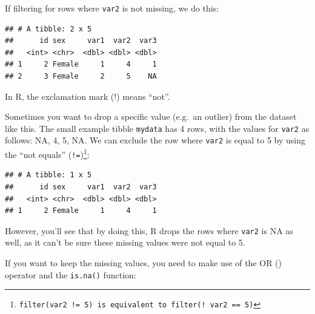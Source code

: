 \documentclass[12pt,]{krantz}
\makeatletter
\newenvironment{Shaded}{\begin{snugshade}}{\end{snugshade}}
\newcommand{\DecValTok}[1]{\textcolor[rgb]{0.00,0.00,0.81}{#1}}
\newcommand{\KeywordTok}[1]{\textcolor[rgb]{0.13,0.29,0.53}{\textbf{#1}}}
\newcommand{\NormalTok}[1]{#1}
\newcommand{\OperatorTok}[1]{\textcolor[rgb]{0.81,0.36,0.00}{\textbf{#1}}}
\newcommand{\StringTok}[1]{\textcolor[rgb]{0.31,0.60,0.02}{#1}}
\newenvironment{kframe}{%
\medskip{}
\setlength{\fboxsep}{.8em}
 \def\at@end@of@kframe{}%
 \ifinner\ifhmode%
  \def\at@end@of@kframe{\end{minipage}}%
  \begin{minipage}{\columnwidth}%
 \fi\fi%
 \def\FrameCommand##1{\hskip\@totalleftmargin \hskip-\fboxsep
 \colorbox{shadecolor}{##1}\hskip-\fboxsep
     \hskip-\linewidth \hskip-\@totalleftmargin \hskip\columnwidth}%
 \MakeFramed {\advance\hsize-\width
   \@totalleftmargin\z@ \linewidth\hsize
   \@setminipage}}%
 {\par\unskip\endMakeFramed%
 \at@end@of@kframe}
\renewenvironment{Shaded}{\begin{kframe}}{\end{kframe}}
\theoremstyle{definition}
\theoremstyle{definition}
\theoremstyle{definition}
\theoremstyle{remark}
\makeatother
\begin{document}
If filtering for rows where \texttt{var2} is not missing, we do this:

\begin{Shaded}
\end{Shaded}

\begin{verbatim}
## # A tibble: 2 x 5
##      id sex     var1  var2  var3
##   <int> <chr>  <dbl> <dbl> <dbl>
## 1     2 Female     1     4     1
## 2     3 Female     2     5    NA
\end{verbatim}

In R, the exclamation mark (!) means ``not''.

Sometimes you want to drop a specific value (e.g.~an outlier) from the
dataset like this. The small example tibble \texttt{mydata} has 4 rows,
with the values for \texttt{var2} as follows: NA, 4, 5, NA. We can
exclude the row where \texttt{var2} is equal to 5 by using the ``not
equals'' (\texttt{!=})\footnote{\texttt{filter(var2\ !=\ 5)\ is\ equivalent\ tolter(!\ var2\ ==\ 5)}}:

\begin{Shaded}
\end{Shaded}

\begin{verbatim}
## # A tibble: 1 x 5
##      id sex     var1  var2  var3
##   <int> <chr>  <dbl> <dbl> <dbl>
## 1     2 Female     1     4     1
\end{verbatim}

However, you'll see that by doing this, R drops the rows where
\texttt{var2} is NA as well, as it can't be sure these missing values
were not equal to 5.

If you want to keep the missing values, you need to make use of the OR
(\texttt{\textbar{}}) operator and the \texttt{is.na()} function:

\begin{Shaded}
\end{Shaded}
\end{document}
